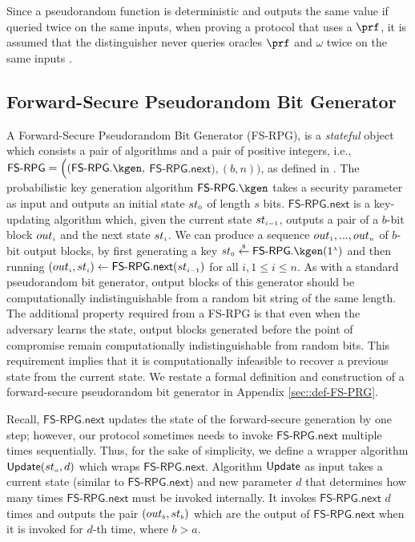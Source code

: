 Since a pseudorandom function is deterministic and outputs the same value if queried twice on the same inputs, when proving a protocol that uses a $\prf$, it is assumed that the distinguisher never queries oracles $\prf$ and $\omega$ twice on the same inputs \cite{KatzLindell2014}. 




 \vspace{-4mm}
\subsection{Forward-Secure Pseudorandom Bit Generator}
 \vspace{-2mm}
A Forward-Secure Pseudorandom Bit Generator (FS-RPG), is a \emph{stateful} object which consists a pair of algorithms and a pair of positive integers, i.e., $\mathsf{FS\text{-}RPG} = \Big((\mathsf{FS\text{-}RPG}.\kgen, $ $ \mathsf{FS\text{-}RPG.next}),( b, n)\Big)$, as defined in \cite{BellareY03}.  The probabilistic key generation algorithm $\mathsf{FS\text{-}RPG}.\kgen$ takes a security parameter as input and outputs an initial state ${st}_{\scriptscriptstyle 0}$ of length $s$ bits. $\mathsf{FS\text{-}RPG.next}$ is a key-updating algorithm which, given the current state ${st}_{\scriptscriptstyle i-1}$, outputs a pair of a $b$-bit block ${out}_{\scriptscriptstyle i}$ and the next state ${st}_{\scriptscriptstyle i}$. We can produce a sequence  ${out}_{\scriptscriptstyle 1},..., {out}_{\scriptscriptstyle n}$  of  $b$-bit output blocks, by first generating a key  ${st}_{\sss 0}\stackrel{\sss \$}\leftarrow\mathsf{FS\text{-}RPG}.\kgen(1^{\sss \lambda})$ and then running $({out}_{\scriptscriptstyle i}, st_{\scriptscriptstyle i})\leftarrow  \mathsf{FS\text{-}RPG.next} (st_{\scriptscriptstyle i-1})$ for all $i, 1\leq i\leq n$. As with a standard pseudorandom bit generator, output blocks of this generator should be computationally indistinguishable from a random bit
string of the same length. The additional property required from a
FS-RPG is that even when the
adversary learns the state, output blocks generated before the point of
compromise remain computationally indistinguishable from random bits.
This requirement implies that it is computationally infeasible to
recover a previous state from the current state. We restate a formal definition and construction of a forward-secure pseudorandom bit generator in Appendix \ref{sec::def-FS-PRG}. 


Recall, $\mathsf{FS\text{-}RPG.next}$ updates the state of the forward-secure generation by one step; however, our protocol sometimes needs to invoke $\mathsf{FS\text{-}RPG.next}$ multiple times sequentially. Thus, for the sake of simplicity, we define a wrapper algorithm $ \mathsf{Update}({st}_{\scriptscriptstyle a}, d)$ which wraps  $\mathsf{FS\text{-}RPG.next}$. Algorithm $\mathsf{Update}$  as input takes a current state (similar to $\mathsf{FS\text{-}RPG.next}$) and new parameter $d$ that determines how many times   $\mathsf{FS\text{-}RPG.next}$ must be invoked internally. It invokes  $\mathsf{FS\text{-}RPG.next}$ $d$ times and outputs the pair  $({out}_{\scriptscriptstyle b}, {st}_{\scriptscriptstyle b})$  which are the output of $\mathsf{FS\text{-}RPG.next}$ when it is invoked for $d$-th time, where $ b> a$. 



